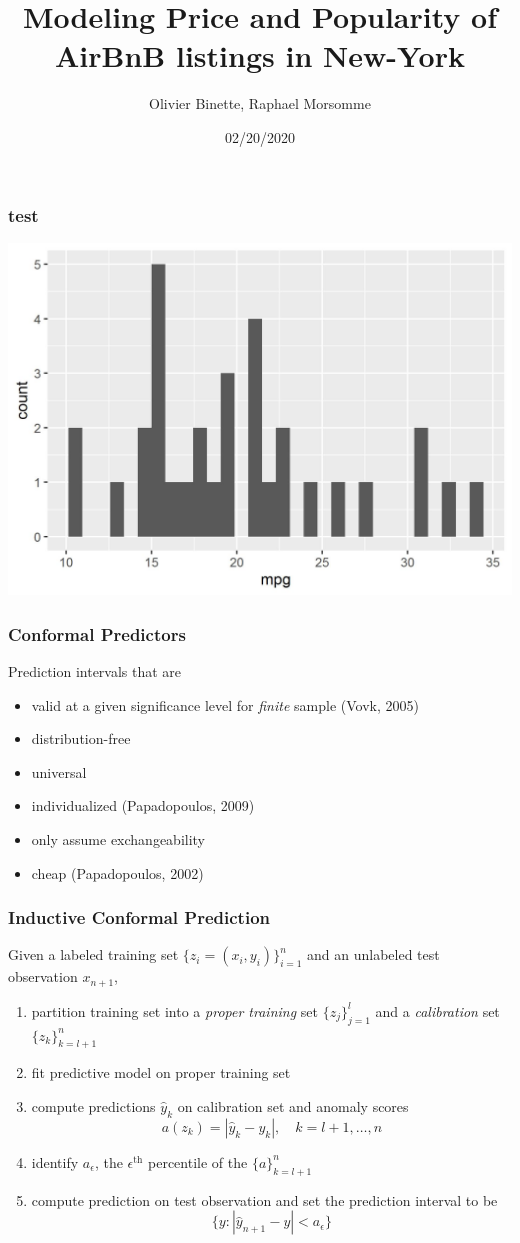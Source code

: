 \documentclass{beamer}
\title{Modeling Price and Popularity of AirBnB listings in New-York}
\author{Olivier Binette, Raphael Morsomme}
\institute{Department of Statistical Science, Duke University}
\date{02/20/2020}
\begin{document}
\frame{\titlepage}


\begin{frame} \frametitle{test}    
    \includegraphics[scale = 0.8]{test.jpeg}
\end{frame}

\begin{frame} \frametitle{Conformal Predictors}

Prediction intervals that are
\begin{itemize}
	\item valid at a given significance level for \textit{finite} sample (Vovk, 2005)
	\item distribution-free
	\item universal
	\item individualized (Papadopoulos, 2009)
	\item only assume exchangeability
	\item cheap (Papadopoulos, 2002)
\end{itemize}
\end{frame}


\begin{frame} \frametitle{Inductive Conformal Prediction}

Given a labeled training set $\{z_i = (x_i, y_i)\}_{i=1}^n$ and an unlabeled test observation $x_{n+1}$,
\begin{enumerate}
	\item partition training set into a \textit{proper training} set $\{z_j\}_{j=1}^l$ and a \textit{calibration} set $\{z_k \}_{k=l+1}^n$
	\item fit predictive model on proper training set
	\item compute predictions $\hat{y}_k$ on calibration set and anomaly scores
	$$a(z_k) = |\hat{y}_k - y_k|, \quad k = l+1, \dots, n$$
	\item identify $a_\epsilon$, the $\epsilon^{\text{th}}$ percentile of the $\{a\}_{k=l+1}^n$
	\item compute prediction on test observation and set the prediction interval to be
	$$\{y: |\hat{y}_{n+1} - y| < a_\epsilon\}$$
	\end{enumerate}
\end{frame}
\end{document}
